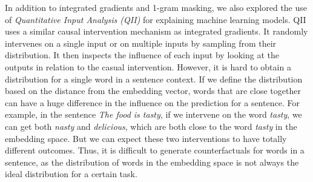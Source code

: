 In addition to integrated gradients and 1-gram masking, we also explored the use of \textit{Quantitative Input Analysis (QII)} \cite{Datta2017} for explaining machine learning models. QII uses a similar causal intervention mechanism as integrated gradients. It randomly intervenes on a single input or on multiple inputs by sampling from their distribution. It then inspects the influence of each input by looking at the outputs in relation to the casual intervention. However, it is hard to obtain a distribution for a single word in a sentence context. If we define the distribution based on the distance from the embedding vector, words that are close together can have a huge difference in the influence on the prediction for a sentence. For example, in the sentence \textit{The food is tasty}, if we intervene on the word \textit{tasty}, we can get both \textit{nasty} and \textit{delicious}, which are both close to the word \textit{tasty} in the embedding space. But we can expect these two interventions to have totally different outcomes. Thus, it is difficult to generate counterfactuals for words in a sentence, as the distribution of words in the embedding space is not always the ideal distribution for a certain task.
